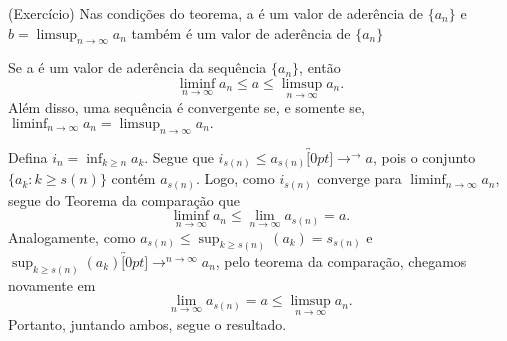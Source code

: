 \documentclass[analysis_notes.tex]{subfiles}
\begin{document}
\begin{crl*}
	(Exerc\'icio) Nas condi\c c\~oes do teorema, a \'e um valor de ader\^encia de $\{a_{n}\}$ e $b = \limsup_{n\to\infty}a_{n}$ tamb\'em \'e um valor de
	ader\^encia de $\{a_{n}\}$
\end{crl*}
\begin{theorem*}
	Se a \'e um valor de ader\^encia da sequ\^encia $\{a_{n}\} $, ent\~ao
	$$
		\liminf_{n\to\infty}a_{n}\leq{a}\leq{\limsup_{n\to\infty}a_{n}}.
	$$
	Al\'em disso, uma sequ\^encia \'e convergente se, e somente se, $\liminf_{n\to\infty}a_{n} = \limsup_{n\to\infty}a_{n}.$
\end{theorem*}
\begin{proof*}
	Defina $i_{n} = \inf_{k\geq{n}}a_{k}$. Segue que $i_{s(n)}\leq{a_{s(n)}}\overbracket[0pt]{\longrightarrow}^{\to }a$, pois o conjunto
	$\{a_{k}: k\geq{s(n)}\}$ cont\'em $a_{s(n)}$. Logo, como $i_{s(n)}$ converge para $\liminf_{n\to\infty}a_{n}$, segue do Teorema da compara\c c\~ao que
	$$
		\liminf_{n\to\infty}a_{n} \leq{\lim_{n\to\infty}a_{s(n)} = a}.
	$$
	Analogamente, como $a_{s(n)}\leq{\sup_{k\geq{s(n)}}{(a_{k})}} = s_{s(n)}$ e $\sup_{k\geq{s(n)}}{(a_{k})}\overbracket[0pt]{\longrightarrow}^{n\to\infty}a_{n}$,
	pelo teorema da compara\c c\~ao, chegamos novamente em
	$$
		\lim_{n\to\infty}a_{s(n)} = a \leq{\limsup_{n\to\infty}a_{n}}.
	$$
	Portanto, juntando ambos, segue o resultado. \qedsymbol
\end{proof*}
\end{document}
